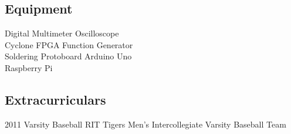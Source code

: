 \documentclass[]{deedy-resume-openfont}
\begin{document}
\begin{minipage}[t]{0.32\textwidth}
\subsection{Equipment}
Digital Multimeter \textbullet{} Oscilloscope \\ 
Cyclone FPGA \textbullet{} Function Generator \\ Soldering \textbullet{} Protoboard \textbullet{} Arduino Uno \\ Raspberry Pi 
\sectionsep

\subsection{Extracurriculars}
2011 Varsity Baseball \textbullet{} RIT Tigers Men's Intercollegiate Varsity Baseball Team 
\sectionsep
%
%

\end{minipage} 
\hfill
\end{document}
